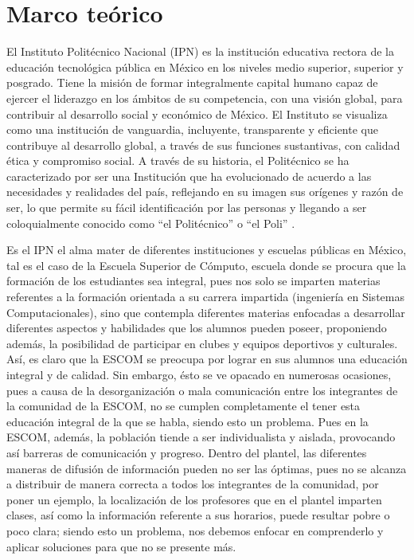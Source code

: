 \section{Marco teórico}

\noindent
El Instituto Politécnico Nacional (IPN) es la institución educativa rectora de la educación tecnológica pública en México en los niveles medio superior, superior y posgrado. Tiene la misión de formar integralmente capital humano capaz de ejercer el liderazgo en los ámbitos de su competencia, con una visión global, para contribuir al desarrollo social y económico de México. 
El Instituto se visualiza como una institución de vanguardia, incluyente, transparente y eficiente que contribuye al desarrollo global, a través de sus funciones sustantivas, con calidad ética y compromiso social. 
A través de su historia, el Politécnico se ha caracterizado por ser una Institución que ha evolucionado de acuerdo a las necesidades y realidades del país, reflejando en su imagen sus orígenes y razón de ser, lo que permite su fácil identificación por las personas y llegando a ser coloquialmente conocido como “el Politécnico” o “el Poli” \cite{IPN}.  

\noindent
\newline
Es el IPN el alma mater de diferentes instituciones y escuelas públicas en México, tal es el caso de la Escuela Superior de Cómputo, escuela donde se procura que la formación de los estudiantes sea integral, pues nos solo se imparten materias referentes a la formación orientada a su carrera impartida (ingeniería en Sistemas Computacionales), sino que contempla diferentes materias enfocadas a desarrollar diferentes aspectos y habilidades que los alumnos pueden poseer, proponiendo además, la posibilidad de participar en clubes y equipos deportivos y culturales. Así, es claro que la ESCOM se preocupa por lograr en sus alumnos una educación integral y de calidad. Sin embargo, ésto se ve opacado en numerosas ocasiones, pues a causa de la desorganización o mala comunicación entre los integrantes de la comunidad de la ESCOM, no se cumplen completamente el tener esta educación integral de la que se habla, siendo esto un problema. Pues en la ESCOM, además, la población tiende a ser individualista y aislada, provocando así barreras de comunicación y progreso. Dentro del plantel, las diferentes maneras de difusión de información pueden no ser las óptimas, pues no se alcanza a distribuir de manera correcta a todos los integrantes de la comunidad, por poner un ejemplo, la localización de los profesores que en el plantel imparten clases, así como la información referente a sus horarios, puede resultar pobre o poco clara; siendo esto un problema, nos debemos enfocar en comprenderlo y aplicar soluciones para que no se presente más. 

